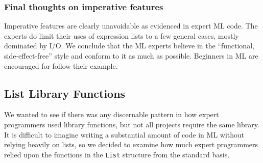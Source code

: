 \documentclass[12pt,abstracton]{scrartcl}
\begin{document}
\subsubsection{Final thoughts on imperative features}
Imperative features are clearly unavoidable as evidenced in expert ML code. The experts do
limit their uses of expression lists to a few general cases, mostly dominated by I/O.
We conclude that the ML experts believe in the ``functional, side-effect-free'' style
and conform to it as much as possible. Beginners in ML are encouraged for follow their example.
\subsection{List Library Functions}\label{subsec:list}
We wanted to see if there was any discernable pattern in how expert programmers
used library functions, but not all projects require the same library.
It is difficult to imagine writing a substantial amount of code in ML without
relying heavily on lists, so we decided to examine how much expert programmers relied upon the functions
in the \texttt{List} structure from the standard basis.
\end{document}
